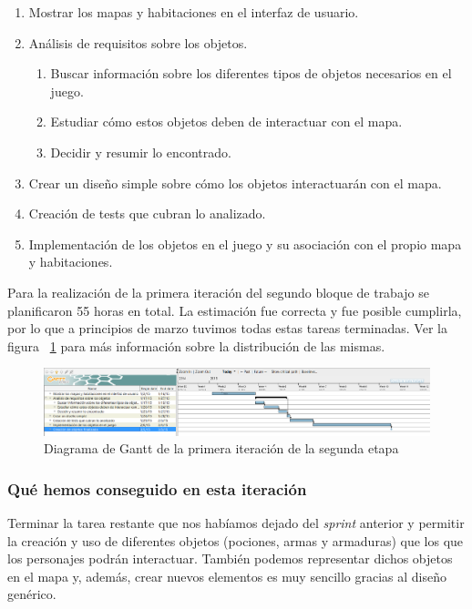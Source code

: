 \begin{enumerate}[label=\bfseries WBS 1.\arabic*]
  \item Mostrar los mapas y habitaciones en el interfaz de usuario.
  \item Análisis de requisitos sobre los objetos.
    \begin{enumerate}[label=\bfseries WBS 1.1.\arabic*]
      \item Buscar información sobre los diferentes tipos de objetos necesarios en el juego.
      \item Estudiar cómo estos objetos deben de interactuar con el mapa.
      \item Decidir y resumir lo encontrado.
    \end{enumerate}
  \item Crear un diseño simple sobre cómo los objetos interactuarán con el mapa.
  \item Creación de tests que cubran lo analizado.
  \item Implementación de los objetos en el juego y su asociación con el propio mapa y habitaciones.
\end{enumerate}

Para la realización de la primera iteración del segundo bloque de trabajo se planificaron 55 horas en total. La estimación fue correcta y fue posible cumplirla, por lo que a principios de marzo tuvimos todas estas tareas terminadas. Ver la figura ~\ref{fig:sec2it1} para más información sobre la distribución de las mismas.

\begin{figure}
    \includegraphics[width=\textwidth,height=\textheight,keepaspectratio]{./img/sec2it1.png}
  \caption{Diagrama de Gantt de la primera iteración de la segunda etapa}
  \label{fig:sec2it1}
\end{figure}

\subsubsection{Qué hemos conseguido en esta iteración}

Terminar la tarea restante que nos habíamos dejado del \textit{sprint} anterior y permitir la creación y uso de diferentes objetos (pociones, armas y armaduras) que los que los personajes podrán interactuar. También podemos representar dichos objetos en el mapa y, además, crear nuevos elementos es muy sencillo gracias al diseño genérico.

